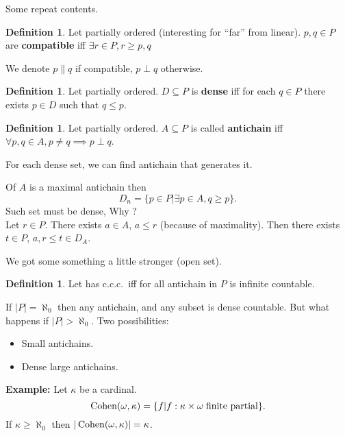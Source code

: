 \documentclass[11pt,pdftex,twoside,a4paper]{article}
\newcommand{\B}[1]{\textbf{#1}}
\newcommand{\Cohen}{\mathop{\rm Cohen}\nolimits}
\newcommand{\ccc}{c.c.c.}
\theoremstyle{definition}
\newtheorem{ldef}[thm]{Definition}
\begin{document}

Some repeat contents.

\begin{ldef}
Let  partially ordered
{\small (interesting for ``far'' from linear)}.
\(p,q\in P\) are \B{compatible}
iff \(\exists r\in P, r\geq p,q\)
\end{ldef}
We denote \(p\| q\) if compatible, \(p\perp q\) otherwise.

\begin{ldef}
Let  partially ordered.
\(D\subseteq P\) is \B{dense} iff for each \(q\in P\) there exists \(p\in D\)
such that \(q\leq p\).
\end{ldef}

\begin{ldef}
Let  partially ordered.
\(A\subseteq P\) is called \B{antichain} iff
\hbox{\(\forall p,q\in A, p\neq q \implies p\perp q\)}.
\end{ldef}

For each dense set, we can find antichain that generates it.

Of $A$ is a maximal antichain then
\begin{equation*}
D_n = \{ p\in P | \exists p \in A, q \geq p\}.
\end{equation*}
Such set must be dense, Why ?\\
Let \(r\in P\). There exists \(a\in A\), \(a \leq r\) (because of maximality).
Then there exists \(t\in P\), \(a,r\leq t \in D_A\).

We got some something a little stronger (open set).

\begin{ldef}
Let  has \ccc\ iff for all antichain in $P$ 
is infinite countable.
\end{ldef}

If \(|P|=\aleph_0\) then any antichain, and any subset is dense countable.
But what happens if \(|P| > \aleph_0\). Two possibilities:
\begin{itemize}
\item Small antichains.
\item Dense large antichains.
\end{itemize}

\B{Example:} Let \(\kappa\) %
be a cardinal.
\begin{equation*}
\Cohen(\omega,\kappa) 
  = \{f | f: \kappa \times \omega \; \textnormal{finite partial}\}.
\end{equation*}
If \(\kappa \geq \aleph_0\) then \(|\Cohen(\omega,\kappa)| = \kappa\).
\end{document}
